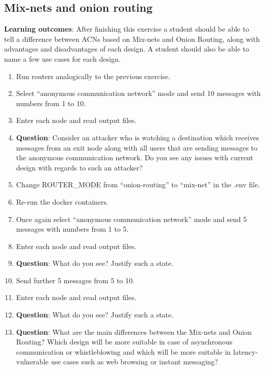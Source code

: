 \subsection{Mix-nets and onion routing}
\textbf{Learning outcomes}: After finishing this exercise a student should be able to tell a difference between ACNs based on Mix-nets and Onion Routing, along with advantages and disadvantages of each design. A student should also be able to name a few use cases for each design.
\begin{enumerate}
    \item Run routers analogically to the previous exercise.
    \item Select “anonymous communication network” mode and send 10 messages with numbers from 1 to 10.
    \item Enter each node and read output files.
    \item \textbf{Question}: Consider an attacker who is watching a destination which receives messages from an exit node along with all users that are sending messages to the anonymous communication network. Do you see any issues with current design with regards to such an attacker?
    \item Change ROUTER\_MODE from “onion-routing” to “mix-net” in the .env file.
    \item Re-run the docker containers.
    \item Once again select “anonymous communication network” mode and send 5 messages with numbers from 1 to 5.
    \item Enter each node and read output files.
    \item \textbf{Question}: What do you see? Justify such a state.
    \item Send further 5 messages from 5 to 10.
    \item Enter each node and read output files.
    \item \textbf{Question}: What do you see? Justify such a state.
    \item \textbf{Question}: What are the main differences between the Mix-nets and Onion Routing? Which design will be more suitable in case of asynchronous communication or whistleblowing and which will be more suitable in latency-vulnerable use cases such as web browsing or instant messaging?
\end{enumerate}

